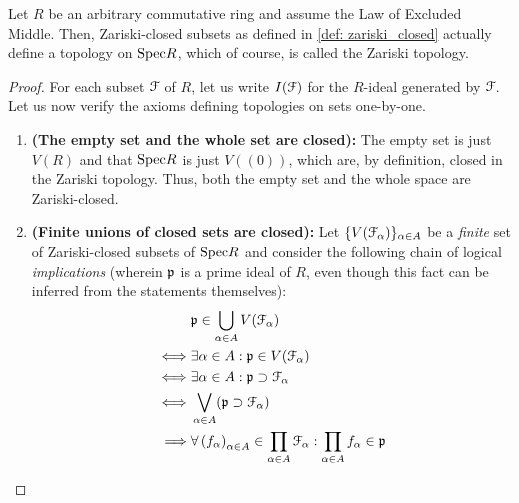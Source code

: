             \begin{proposition} \label{prop: zariski_closed_well_definiteness}
                Let $R$ be an arbitrary commutative ring and assume the Law of Excluded Middle. Then, Zariski-closed subsets as defined in \ref{def: zariski_closed} actually define a topology on $\Spec R$, which of course, is called the Zariski topology.
            \end{proposition}
                \begin{proof}
                    For each subset $\calF$ of $R$, let us write $I(\calF)$ for the $R$-ideal generated by $\calF$. Let us now verify the axioms defining topologies on sets one-by-one.
                        \begin{enumerate}
                            \item \textbf{(The empty set and the whole set are closed):} The empty set is just $V(R)$ and that $\Spec R$ is just $V\left((0)\right)$, which are, by definition, closed in the Zariski topology. Thus, both the empty set and the whole space are Zariski-closed.
                            \item \textbf{(Finite unions of closed sets are closed):} Let $\{V(\calF_{\alpha})\}_{\alpha \in A}$ be a \textit{finite} set of Zariski-closed subsets of $\Spec R$ and consider the following chain of logical \textit{implications} (wherein $\p$ is a prime ideal of $R$, even though this fact can be inferred from the statements themselves):
                                $$
                                    \begin{aligned}
                                        & \p \in \bigcup_{\alpha \in A} V(\calF_{\alpha})
                                        \\
                                        \iff & \exists \alpha \in A: \p \in V(\calF_{\alpha})
                                        \\
                                        \iff & \exists \alpha \in A: \p \supset \calF_{\alpha}
                                        \\
                                        \iff & \bigvee_{\alpha \in A} (\p \supset \calF_{\alpha})
                                        \\
                                        \implies & \forall \left(f_{\alpha}\right)_{\alpha \in A} \in \prod_{\alpha \in A} \calF_{\alpha}: \prod_{\alpha \in A} f_{\alpha} \in \p
                                        \\

\end{aligned}$$
\end{enumerate}
\end{proof}
